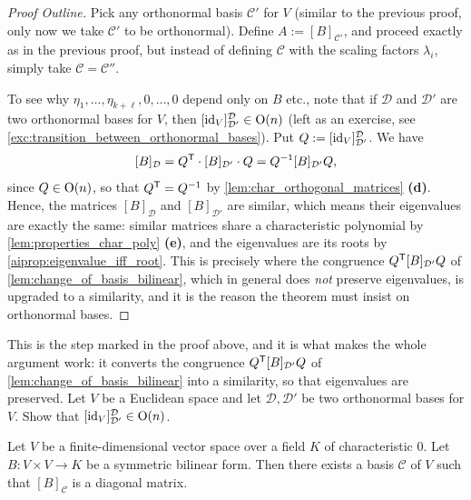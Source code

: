 \begin{proof}[Proof Outline]
Pick any orthonormal basis $\mathcal{C}'$ for $V$ (similar to the previous proof, only now we take $\mathcal{C}'$ to be orthonormal). Define $A := [B]_{\mathcal{C}'}$, and proceed exactly as in the previous proof, but instead of defining $\mathcal{C}$ with the scaling factors $\lambda_i$, simply take $\mathcal{C} = \mathcal{C}''$.

To see why $\eta_1, \dots, \eta_{k+\ell}, 0, \dots, 0$ depend only on $B$ etc., note that if $\mathcal{D}$ and $\mathcal{D}'$ are two orthonormal bases for $V$, then $[\operatorname{id}_V]_{\mathcal{D}'}^{\mathcal{D}} \in \operatorname{O}(n)$ (left as an exercise, see \cref{exc:transition_between_orthonormal_bases}). Put $Q := [\operatorname{id}_V]_{\mathcal{D}'}^{\mathcal{D}}$.
We have
\[
[B]_{\mathcal{D}} = Q^{\mathsf{T}} \cdot [B]_{\mathcal{D}'} \cdot Q = Q^{-1} [B]_{\mathcal{D}'} Q,
\]
since $Q \in \operatorname{O}(n)$, so that $Q^{\mathsf{T}} = Q^{-1}$ by \cref{lem:char_orthogonal_matrices} \textbf{(d)}. Hence, the matrices $[B]_{\mathcal{D}}$ and $[B]_{\mathcal{D}'}$ are similar, which means their eigenvalues are exactly the same: similar matrices share a characteristic polynomial by \cref{lem:properties_char_poly} \textbf{(e)}, and the eigenvalues are its roots by \cref{aiprop:eigenvalue_iff_root}. This is precisely where the congruence $Q^{\mathsf{T}} [B]_{\mathcal{D}'} Q$ of \cref{lem:change_of_basis_bilinear}, which in general does \emph{not} preserve eigenvalues, is upgraded to a similarity, and it is the reason the theorem must insist on orthonormal bases.
\end{proof}

\begin{exercise}
\label{exc:transition_between_orthonormal_bases}
This is the step marked  in the proof above, and it is what makes the whole argument work: it converts the congruence $Q^{\mathsf{T}} [B]_{\mathcal{D}'} Q$ of \cref{lem:change_of_basis_bilinear} into a similarity, so that eigenvalues are preserved. Let $V$ be a Euclidean space and let $\mathcal{D}, \mathcal{D}'$ be two orthonormal bases for $V$. Show that $[\operatorname{id}_V]_{\mathcal{D}'}^{\mathcal{D}} \in \operatorname{O}(n)$.
\end{exercise}

\begin{theorem}
\label{thm:diagonalization_symmetric_bilinear}
Let $V$ be a finite-dimensional vector space over a field $K$ of characteristic $0$. Let $B \colon V \times V \to K$ be a symmetric bilinear form. Then there exists a basis $\mathcal{C}$ of $V$ such that $[B]_{\mathcal{C}}$ is a diagonal matrix.
\end{theorem}

